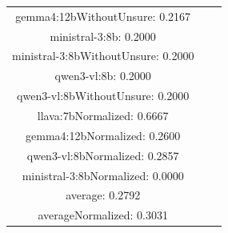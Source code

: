 \documentclass[a4paper]{article}
\begin{document}
\begin{tabular}{ccc}
gemma4:12bWithoutUnsure: 0.2167 \\ ministral-3:8b: 0.2000 \\ ministral-3:8bWithoutUnsure: 0.2000 \\ qwen3-vl:8b: 0.2000 \\ qwen3-vl:8bWithoutUnsure: 0.2000 \\ llava:7bNormalized: 0.6667 \\ gemma4:12bNormalized: 0.2600 \\ qwen3-vl:8bNormalized: 0.2857 \\ ministral-3:8bNormalized: 0.0000 \\ average: 0.2792 \\ averageNormalized: 0.3031 \end{minipage}\\
\end{tabular}

\vspace{5mm}
\end{document}
